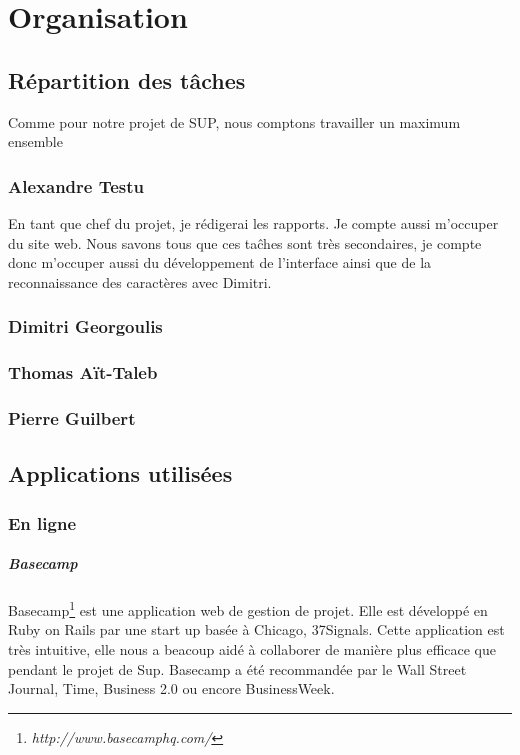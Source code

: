 \documentclass[]{report}
\begin{document}
\chapter{Organisation} %
\label{cha:organisation}
	\section{R\'epartition des t\^aches} %
	\label{sec:r'epartition_des_t^aches}
		Comme pour notre projet de SUP, nous comptons travailler un maximum ensemble
		\subsection{Alexandre Testu} %
		\label{sub:alexandre_testu}
			En tant que chef du projet, je r\'edigerai les rapports. Je compte aussi m'occuper du site web. Nous savons tous que ces ta\^ches sont tr\`es secondaires, je compte donc m'occuper aussi du d\'eveloppement de l'interface ainsi que de la reconnaissance des caract\`eres avec Dimitri.
		\subsection{Dimitri Georgoulis} %
		\label{sub:dimitri_georgoulis}
		
		\subsection{Thomas A\"it-Taleb} %
		\label{sub:thomas_a"it_taleb}
		
		\subsection{Pierre Guilbert} %
		\label{sub:pierre_guilbert}
		
	
	\section{Applications utilis\'ees} %
	\label{sec:applications_utilis'ees}
		\subsection{En ligne} %
		\label{sub:en_ligne}
			\paragraph{Basecamp\\} %
			\label{par:basecamp}
			Basecamp\footnote{\emph{http://www.basecamphq.com/}} est une application web de gestion de projet. Elle est développ\'e en Ruby on Rails par une start up bas\'ee \`a Chicago, 37Signals. Cette application est tr\`es intuitive, elle nous a beacoup aid\'e \`a collaborer de mani\`ere plus efficace que pendant le projet de Sup. Basecamp a \'et\'e recommand\'ee par le Wall Street Journal, Time, Business 2.0 ou encore BusinessWeek.
\end{document}
